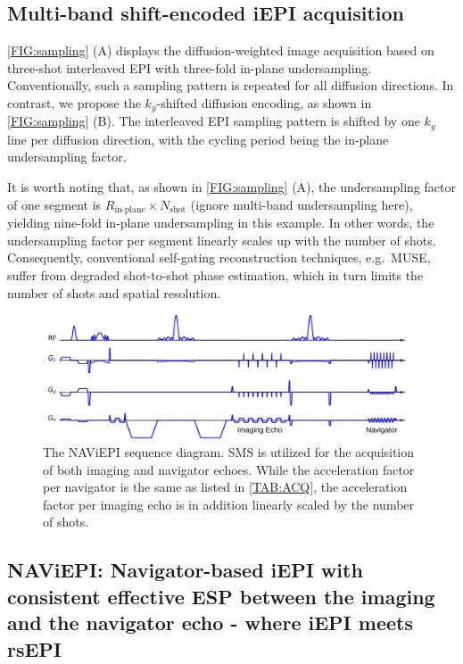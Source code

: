 \documentclass[preprint,12pt,authoryear,review]{elsarticle}
\begin{document}
    \subsection{Multi-band shift-encoded iEPI acquisition}

    \cref{FIG:sampling} (A) displays the diffusion-weighted image
    acquisition based on three-shot interleaved EPI
    with three-fold in-plane undersampling.
    Conventionally, such a sampling pattern is repeated
    for all diffusion directions.
    In contrast, we propose the $k_y$-shifted diffusion encoding,
    as shown in \cref{FIG:sampling} (B).
    The interleaved EPI sampling pattern is shifted by one $k_y$ line
    per diffusion direction,
    with the cycling period being the in-plane undersampling factor.

    It is worth noting that, as shown in \cref{FIG:sampling} (A),
    the undersampling factor of one segment is
    $R_\text{in-plane} \times N_\mathrm{shot}$
    (ignore multi-band undersampling here),
    yielding nine-fold in-plane undersampling in this example.
    In other words, the undersampling factor per segment
    linearly scales up with the number of shots.
    Consequently, conventional self-gating reconstruction techniques,
    e.g.~MUSE, suffer from degraded shot-to-shot phase estimation,
    which in turn limits the number of shots and spatial resolution.

    \begin{figure}
        \centering
        \includegraphics[width=\linewidth]{../figures/fig2.png}
        \caption{The NAViEPI sequence diagram.
        SMS is utilized for the acquisition of both imaging and
        navigator echoes. While the acceleration factor per navigator is
        the same as listed in \cref{TAB:ACQ},
        the acceleration factor per imaging echo is
        in addition linearly scaled by the number of shots.}
        \label{FIG:seq}
    \end{figure}

    \subsection{NAViEPI: Navigator-based iEPI with consistent effective ESP
    between the imaging and the navigator echo - where iEPI meets rsEPI}
\end{document}
